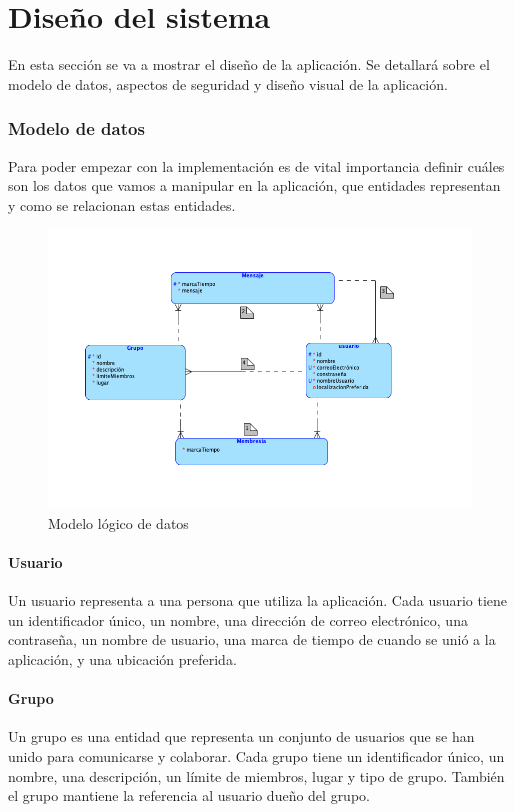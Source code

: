\chapter{Diseño del sistema}
En esta sección se va a mostrar el diseño de la aplicación. Se detallará sobre el modelo de datos, aspectos de seguridad y diseño visual de la aplicación.

\subsection{Modelo de datos}
Para poder empezar con la implementación es de vital importancia definir cuáles son los datos que vamos a manipular en la aplicación, que entidades representan y como se relacionan estas entidades.

    \begin{figure}[H]
        \centering
        \includegraphics[width=0.7\linewidth]{images/Screenshot 2023-05-17 at 21.26.11.png}
        \caption{Modelo lógico de datos}
        \label{fig:diagramaER}
    \end{figure}

\subsubsection{Usuario}
Un usuario representa a una persona que utiliza la aplicación. Cada usuario tiene un identificador único, un nombre, una dirección de correo electrónico, una contraseña, un nombre de usuario, una marca de tiempo de cuando se unió a la aplicación, y una ubicación preferida.

\subsubsection{Grupo}
Un grupo es una entidad que representa un conjunto de usuarios que se han unido para comunicarse y colaborar. Cada grupo tiene un identificador único, un nombre, una descripción, un límite de miembros, lugar y tipo de grupo. También el grupo mantiene la referencia al usuario dueño del grupo.


